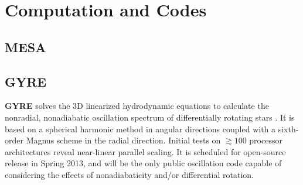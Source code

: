 \section{Computation and Codes}
    
    
{\color{green}    
\subsection{MESA}



}    
    
    
{\color{brown}    
\subsection{GYRE}}
 \textbf{GYRE} solves the 3D linearized hydrodynamic
equations to calculate the nonradial, nonadiabatic oscillation
spectrum of differentially rotating stars \citep{bard11}. It is based
on a spherical harmonic method in angular directions coupled with a
sixth-order Magnus scheme in the radial direction. Initial tests on
$\gtrsim 100$ processor architectures reveal near-linear parallel
scaling. It is scheduled for open-source release in
Spring 2013, and will be the only public oscillation code capable of
considering the effects of nonadiabaticity and/or differential
rotation.
